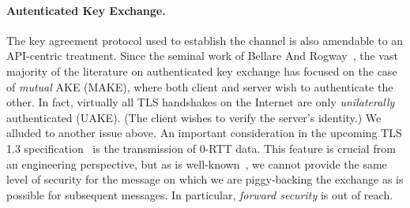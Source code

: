 \fi
%

\paragraph{Autenticated Key Exchange. }
The key agreement protocol used to establish the channel is also amendable to an
API-centric treatment.
%
Since the seminal work of Bellare And Rogway~\cite{BR93}, the vast majority of
the literature on authenticated key exchange has focused on the case of
\emph{mutual} AKE (MAKE), where both client and server wish to authenticate the
other. In fact, virtually all TLS handshakes on the Internet are only
\emph{unilaterally} authenticated (UAKE). (The client wishes to verify the
server's identity.)
%
\fi
%
We alluded to another issue above. An important consideration in the upcoming TLS 1.3
specification~\cite{tls13} is the transmission of 0-RTT data.
%
This feature is crucial from an engineering perspective, but as is
well-known~\cite[Section 2.2]{tls13}, we cannot provide the same level of
security for the message on which we are piggy-backing the exchange as is
possible for subsequent messages. In particular, \emph{forward security} is out
of reach.

